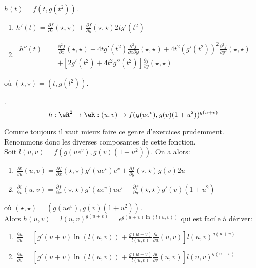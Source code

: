 \noindent $h(t)=f(t,g(t^2))$.\\

\begin{enumerate}
	\item $h'(t)=\frac{ \partial f }{ \partial x }(\star,\star)+\frac{ \partial f }{ \partial y }(\star,\star)2tg'(t^2)$
	\item $ \begin{array}{rl} h''(t)= & \frac{ \partial^2f }{ \partial x }(\star,\star)+4tg'(t^2)\frac{ \partial^2f }{ \partial x\partial y }(\star,\star)+4t^2(g'(t^2))^2\frac{ \partial^2f }{ \partial y^2 }(\star,\star) \\
                          & +[2g'(t^2)+4t^2g''(t^2)]\frac{ \partial f }{ \partial y }(\star,\star)\end{array}$

\end{enumerate}
où $(\star,\star) = (t,g(t^2))$.

\vspace{1cm}

.
\[h:\eR^2\rightarrow \eR:(u,v)\rightarrow  f(g(ue^v),g(v)(1+u^2))^{g(u+v)}\]

\noindent Comme toujours il vaut mieux faire ce genre d'exercices prudemment. Renommons donc les diverses composantes de cette fonction.\\

\noindent Soit $l(u,v)=f(g(ue^v),g(v)(1+u^2))$. On a alors:
\begin{enumerate}
	\item $\frac{ \partial l }{ \partial u }(u,v) = \frac{ \partial f }{ \partial x }(\star,\star)g'(ue^v)e^v + \frac{ \partial f }{ \partial y }(\star,\star)g(v)2u$
	\item $\frac{ \partial l }{ \partial v }(u,v) = \frac{ \partial f }{ \partial x }(\star,\star)g'(ue^v)ue^v+\frac{ \partial f }{ \partial y }(\star,\star)g'(v)(1+u^2)$
\end{enumerate}
o\`{u} $(\star,\star)=(g(ue^v),g(v)(1+u^2))$.\\

\noindent Alors $h(u,v)=l(u,v)^{g(u+v)} = e^{g(u+v)\ln(l(u,v))}$ qui est facile à dériver:

\begin{enumerate}
	\item $\frac{ \partial h }{ \partial u } = [g'(u+v)\ln(l(u,v))+\frac{g(u+v)}{l(u,v)}\frac{ \partial l }{ \partial u }(u,v)] l(u,v)^{g(u+v)}$
	\item $\frac{ \partial h }{ \partial v } = [g'(u+v)\ln(l(u,v))+\frac{g(u+v)}{l(u,v)}\frac{ \partial l }{ \partial v }(u,v)] l(u,v)^{g(u+v)}$
\end{enumerate}



